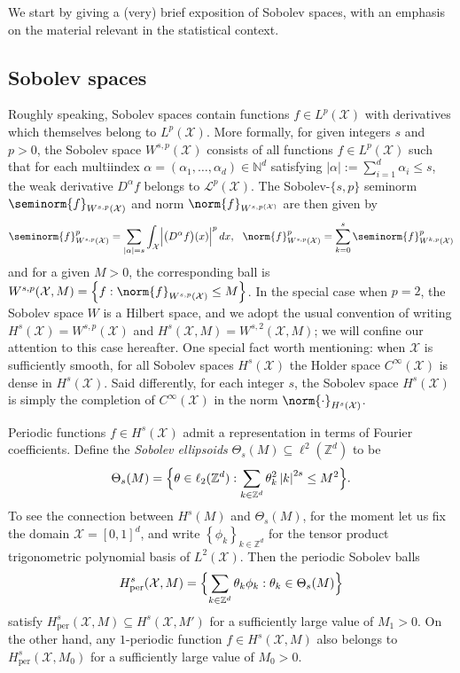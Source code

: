 \documentclass{article}
\newcommand{\abs}[1]{\left \lvert #1 \right \rvert}
\newcommand{\set}[1]{\left\{#1\right\}}
\newcommand{\1}{\mathbf{1}}
\newcommand{\Xset}{\mathcal{X}}
\newcommand{\Leb}{L}
\theoremstyle{alden}
\theoremstyle{aldenthm}
\theoremstyle{definition}
\theoremstyle{remark}
\begin{document}
We start by giving a (very) brief exposition of Sobolev spaces, with an emphasis on the material relevant in the statistical context. 

\subsection{Sobolev spaces}
\label{subsec:sobolev_spaces}

Roughly speaking, Sobolev spaces contain functions $f \in \Leb^p(\Xset)$ with derivatives which themselves belong to $\Leb^p(\Xset)$. More formally, for given integers $s$ and $p > 0$, the Sobolev space $W^{s,p}(\Xset)$ consists of all functions $f \in \Leb^p(\Xset)$ such that for each multiindex $\alpha = (\alpha_1,\ldots,\alpha_d) \in \mathbb{N}^d$ satisfying $\abs{\alpha} := \sum_{i = 1}^{d} \alpha_i \leq s$, the weak derivative $D^{\alpha}f$ belongs to $\mathcal{L}^p(\Xset)$. The Sobolev-$\{s,p\}$ seminorm $\seminorm{f}_{W^{s,p}(\Xset)}$ and norm $\norm{f}_{W^{s,p(\Xset)}}$ are then given by 
\begin{equation*}
\seminorm{f}_{W^{s,p}(\Xset)}^p = \sum_{\abs{\alpha} = s}\int_{\mathcal{X}} \Bigl|\bigl(D^{\alpha}f\bigr)(x)\Bigr|^p \,dx, ~~ \norm{f}_{W^{s,p}(\Xset)}^p = \sum_{k = 0}^{s} \seminorm{f}_{W^{k,p}(\Xset)}^p
\end{equation*}
and for a given $M > 0$, the corresponding ball is $W^{s,p}(\Xset, M) = \set{f: \norm{f}_{W^{s,p}(\Xset)} \leq M}$. In the special case when $p = 2$, the Sobolev space $W$ is a Hilbert space, and we adopt the usual convention of writing $H^s(\Xset) = W^{s,p}(\Xset)$ and $H^s(\Xset,M) = W^{s,2}(\Xset,M)$; we will confine our attention to this case hereafter. One special fact worth mentioning: when $\Xset$ is sufficiently smooth, for all Sobolev spaces $H^s(\Xset)$ the Holder space $C^{\infty}(\Xset)$ is dense in $H^s(\Xset)$. Said differently, for each integer $s$, the Sobolev space $H^s(\Xset)$ is simply the completion of $C^{\infty}(\Xset)$ in the norm $\norm{\cdot}_{H^s(\Xset)}$.

Periodic functions $f \in H^s(\Xset)$ admit a representation in terms of Fourier coefficients. Define the \emph{Sobolev ellipsoids} $\Theta_s(M) \subseteq \ell^2(\mathbb{Z}^d)$ to be
\begin{equation*}
\Theta_s(M) = \Bigl\{\theta \in \ell_2(\mathbb{Z}^d): \sum_{k \in \mathbb{Z}^d} \theta_k^2 \abs{k}^{2s} \leq M^2\Bigr\}.
\end{equation*}
To see the connection between $H^s(M)$ and $\Theta_s(M)$, for the moment let us fix the domain $\Xset = [0,1]^d$, and write $\set{\phi_k}_{k \in \mathbb{Z}^d}$ for the tensor product trigonometric polynomial basis of $\Leb^2(\Xset)$. Then the periodic Sobolev balls
\begin{equation*}
H_{\textrm{per}}^s(\Xset,M) = \Bigl\{\sum_{k \in \mathbb{Z}^d} \theta_k \phi_k: \theta_k \in \Theta_s(M) \Bigr\}
\end{equation*}
satisfy $H_{\textrm{per}}^s(\Xset,M) \subseteq H^s(\Xset,M')$ for a sufficiently large value of $M_1 > 0$. On the other hand, any $1$-periodic function $f \in H^s(\Xset,M)$ also belongs to $H_{\textrm{per}}^s(\Xset,M_0)$ for a sufficiently large value of $M_0 > 0$.
\end{document}
